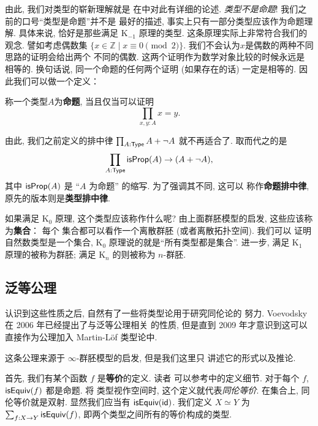 由此, 我们对类型的崭新理解就是
在\cite{ufp:2013:hottbook}中对此有详细的论述.
\emph{类型不是命题}! 我们之前的口号“类型是命题”并不是
最好的描述, 事实上只有一部分类型应该作为命题理解.
具体来说, 恰好是那些满足 K\(_{-1}\) 原理的类型.
这条原理实际上非常符合我们的观念.
譬如考虑偶数集 \(\{x \in \mathbb Z \mid x \equiv 0 \pmod 2\}\).
我们不会认为\(x\)是偶数的两种不同思路的证明会给出两个
不同的偶数. 这两个证明作为数学对象比较的时候永远是
相等的. 换句话说, 同一个命题的任何两个证明 (如果存在的话)
一定是相等的. 因此我们可以做一个定义：
\begin{definition}
称一个类型\(A\)为\textbf{命题}, 当且仅当可以证明
\[\prod_{x,y:A} x = y.\]
\end{definition}
由此, 我们之前定义的排中律
\(\prod_{A : \textsf{Type}} A + \neg A\)
就不再适合了. 取而代之的是
\[\prod_{A : \textsf{Type}} \textsf{isProp}(A) \to
(A + \neg A),\] 其中 \(\textsf{isProp}(A)\)
是 “\(A\) 为命题” 的缩写. 为了强调其不同, 这可以
称作\textbf{命题排中律}, 原先的版本则是\textbf{类型排中律}.

如果满足 K\(_0\) 原理, 这个类型应该称作什么呢?
由上面群胚模型的启发, 这些应该称为\textbf{集合}： 每个
集合都可以看作一个离散群胚 (或者离散拓扑空间). 我们可以
证明自然数类型是一个集合,
K\(_0\) 原理说的就是“所有类型都是集合”. 进一步, 满足
K\(_1\) 原理的被称为群胚; 满足 K\(_n\) 的则被称为 \(n\)-群胚.

\subsection{泛等公理}
认识到这些性质之后, 自然有了一些将类型论用于研究同伦论的
努力. Voevodsky 在 2006 年已经提出了与泛等公理相关
的性质, 但是直到 2009 年才意识到这可以直接作为公理加入
Martin-L\"of 类型论中.

这条公理来源于 \(\infty\)-群胚模型的启发, 但是我们这里只
讲述它的形式以及推论.

首先, 我们有某个函数 \(f\) 是\textbf{等价}的定义. 读者
可以参考\cite{escardo:2018:univalence}中的定义细节.
对于每个 \(f\), \(\textsf{isEquiv}(f)\) 都是命题. 将
类型视作空间时, 这个定义就代表\emph{同伦等价}. 在集合上,
同伦等价就是双射. 显然我们应当有 \(\textsf{isEquiv}(\textsf{id})\).
我们定义 \(X\simeq Y\) 为 \(\sum_{f : X \to Y}\textsf{isEquiv}(f)\),
即两个类型之间所有的等价构成的类型.

